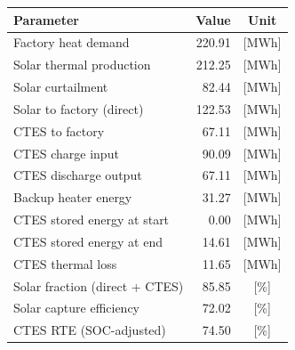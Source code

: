 \renewcommand{\arraystretch}{1.2}
\begin{table}[h]
\centering
\begin{tabular}{l|r c}
\hline
Parameter & Value & Unit \\
\hline
Factory heat demand & 220.91 & [MWh] \\
Solar thermal production & 212.25 & [MWh] \\
Solar curtailment & 82.44 & [MWh] \\
Solar to factory (direct) & 122.53 & [MWh] \\
CTES to factory & 67.11 & [MWh] \\
CTES charge input & 90.09 & [MWh] \\
CTES discharge output & 67.11 & [MWh] \\
Backup heater energy & 31.27 & [MWh] \\
CTES stored energy at start & 0.00 & [MWh] \\
CTES stored energy at end & 14.61 & [MWh] \\
CTES thermal loss & 11.65 & [MWh] \\
\hline
Solar fraction (direct + CTES) & 85.85 & [\%] \\
Solar capture efficiency & 72.02 & [\%] \\
CTES RTE (SOC-adjusted) & 74.50 & [\%] \\
\hline
\end{tabular}
\end{table}
